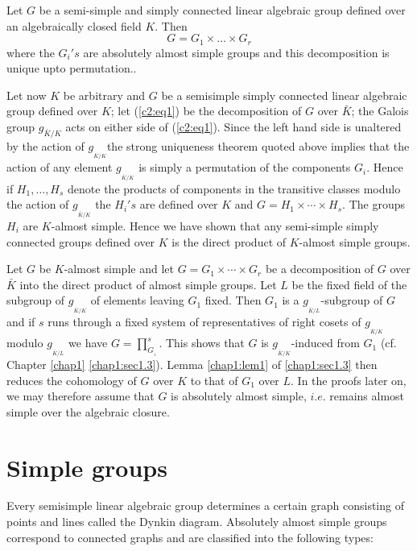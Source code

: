 Let $G$ be a semi-simple and simply connected linear algebraic group
defined over an algebraically closed field $K$. Then 
\begin{equation*}
G= G_1 \times \ldots \times G_r \tag{1}\label{c2:eq1}
\end{equation*}
where the $G_i's $ are absolutely almost simple groups and this
decomposition is unique upto  permutation.. 

Let now $K$ be arbitrary and $G$ be a semisimple simply connected
linear algebraic group defined over $K$; let (\ref{c2:eq1}) be the
decomposition of $G$ over $\bar{K}$; the Galois group $g_{\bar{K}/K}$
acts on either side of (\ref{c2:eq1}). Since the left hand side is unaltered
by the action of $g_{_{\bar{K}/K}}$\pageoriginale the strong
uniqueness theorem quoted above implies that the action of any element
$g_{_{\bar{K}/K}}$  is simply a permutation of the components
$G_i$. Hence if $H_1 ,\ldots,H_s$ denote the products of components in
the transitive classes modulo the action of $g_{_{\bar{K}/K}}$ the
$H_i's$ are defined over $K$ and $G = H_1 \times \cdots \times
H_s$. The groups $H_i$ are $K$-almost simple. Hence we have shown that
any semi-simple simply connected groups defined over $K$ is the direct
product of $K$-almost simple groups. 

Let $G$ be $K$-almost simple and let $G = G_1 \times \cdots \times G_r$
be a decomposition of $G$ over $\bar{K}$ into the direct product of
almost simple  groups. Let $L$ be the fixed field of the subgroup of
$g_{_{\bar{K}/K}}$ of elements leaving $G_1$ fixed. Then $G_1$ is a
$g_{_{\bar{K}/L}}$-subgroup of $G$ and if $s$ runs through a fixed
system of representatives of right cosets of $g_{_{\bar{K}/K}}$
modulo $g_{_{\bar{K}/L}}$ we have $G = \prod^s_{G_{_1}}$. This shows
that $G$ is $g_{_{\bar{K}/K}}$-induced from $G_1$ (cf. Chapter \ref{chap1}
\ref{chap1:sec1.3}). Lemma \ref{chap1:lem1} of
\ref{chap1:sec1.3} then  reduces the cohomology of $G$ over $K$ 
to that of $G_1$ over $L$. In the proofs later on, we may therefore
assume that $G$ is absolutely almost simple, $i.e$. remains almost
simple over the algebraic closure.  


\section{Simple groups}\label{chap2:sec2.3}

Every semisimple linear algebraic group determines a certain graph
consisting of points and lines called the Dynkin diagram. Absolutely
almost simple groups correspond to connected graphs and are classified
into the following types: 

